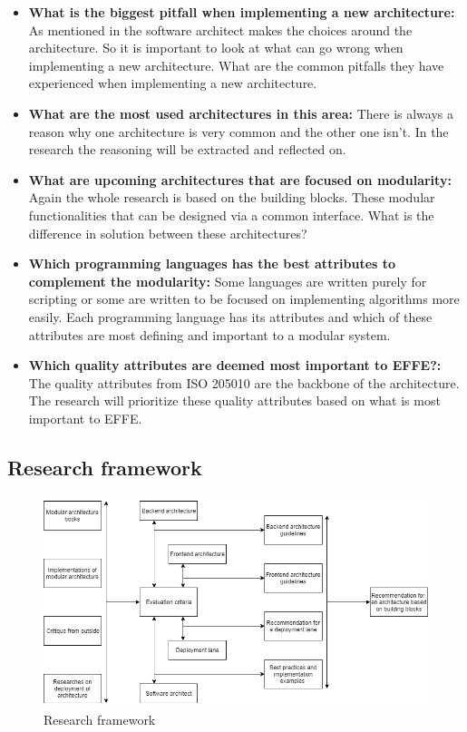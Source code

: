 \begin{itemize}
	\item \textbf{What is the biggest pitfall when implementing a new architecture: }As mentioned in  the software architect makes the choices around the architecture. So it is important to look at what can go wrong when implementing a new architecture. What are the common pitfalls they have experienced when implementing a new architecture.

	\item \textbf{What are the most used architectures in this area: }There is always a reason why one architecture is very common and the other one isn't. In the research the reasoning will be extracted and reflected on.

	\item \textbf{What are upcoming architectures that are focused on modularity: }Again the whole research is based on the building blocks. These modular functionalities that can be designed via a common interface. What is the difference in solution between these architectures?

	\item \textbf{Which programming languages has the best attributes to complement the modularity: }Some languages are written purely for scripting or some are written to be focused on implementing algorithms more easily. Each programming language has its attributes and which of these attributes are most defining and important to a modular system.

	\item \textbf{Which quality attributes are deemed most important to EFFE?: }The quality attributes from ISO 205010 \cite{iso25010} are the backbone of the architecture. The research will prioritize these quality attributes based on what is most important to EFFE.
\end{itemize}

\subsection{Research framework}

\begin{figure}[H]
	\includegraphics[width=\linewidth]{research_framework.png}
	\caption{Research framework}
\end{figure}

